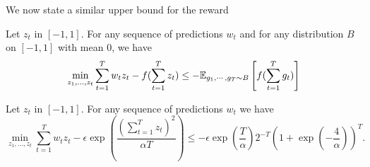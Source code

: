 We now state a similar upper bound for the reward
\begin{theorem}
Let $z_t$ in $[-1,1]$. For any sequence of predictions $w_t$ and 
for any distribution $B$ on $[-1,1]$ with mean 0, we have 
\[
\min_{z_1, \ldots, z_t} \sum_{t=1}^T w_t z_t - f(\sum_{t=1}^T z_t) \leq -\mathbb{E}_{g_1, \cdots, g_T \sim B} \left[f(\sum_{t=1}^T g_t)\right]
\]
\end{theorem}

\begin{cor}
Let $z_t$ in $[-1,1]$. For any sequence of predictions $w_t$ we have
\[
\min_{z_1, \ldots, z_t} \sum_{t=1}^T w_t z_t - \epsilon \exp\left(\frac{(\sum_{t=1}^T z_t)^2}{\alpha T}\right) \leq -\epsilon\exp\left(\frac{T}{\alpha}\right) 2^{-T} \left(1+\exp\left(-\frac{4}{\alpha}\right)\right)^T.
\]
\end{cor}
